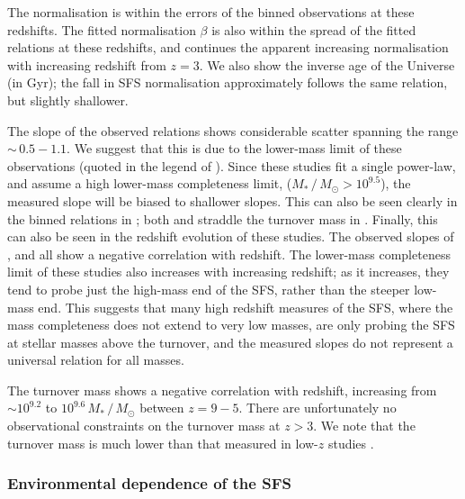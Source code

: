 The normalisation is within the errors of the binned observations at these redshifts.
The fitted normalisation $\beta$ is also within the spread of the fitted relations at these redshifts, and continues the apparent increasing normalisation with increasing redshift from $z = 3$.
We also show the inverse age of the Universe (in Gyr); the fall in SFS normalisation approximately follows the same relation, but slightly shallower.

The slope of the observed relations shows considerable scatter spanning the range $\sim \, 0.5 - 1.1$.
We suggest that this is due to the lower-mass limit of these observations (quoted in the legend of ).
Since these studies fit a single power-law, and assume a high lower-mass completeness limit, ($M_{*} \,/\, M_{\odot} > 10^{9.5}$), the measured slope will be biased to shallower slopes.
This can also be seen clearly in the binned relations in ; both \cite{santini_star_2017} and \cite{song_evolution_2016} straddle the turnover mass in \flares.
Finally, this can also be seen in the redshift evolution of these studies.
The observed slopes of \cite{salmon_relation_2015}, \cite{behroozi_average_2013} and \cite{santini_star_2017} all show a negative correlation with redshift.
The lower-mass completeness limit of these studies also increases with increasing redshift; as it increases, they tend to probe just the high-mass end of the SFS, rather than the steeper low-mass end.
This suggests that many high redshift measures of the SFS, where the mass completeness does not extend to very low masses, are only probing the SFS at stellar masses above the turnover, and the measured slopes do not represent a universal relation for all masses.

The turnover mass shows a negative correlation with redshift, increasing from $\sim 10^{9.2}$ to $10^{9.6} \, M_{*} \,/\, M_{\odot}$ between $z = 9 - 5$.
There are unfortunately no observational constraints on the turnover mass at $z > 3$.
We note that the turnover mass is much lower than that measured in low-$z$ studies  \citep[$> 10^{10} \, M_{*} \,/\, M_{\odot}$ at $z \leqslant 3$,][]{whitaker_constraining_2014,tasca_evolving_2015}.


\subsubsection{Environmental dependence of the SFS}

